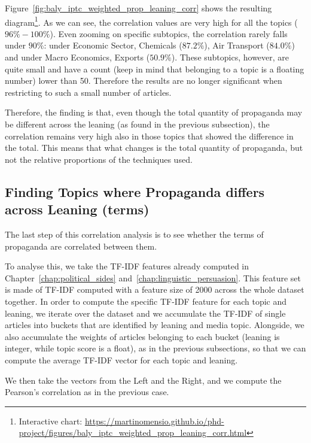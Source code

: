 Figure~\ref{fig:baly_iptc_weighted_prop_leaning_corr} shows the resulting diagram\footnote{Interactive chart: \url{https://martinomensio.github.io/phd-project/figures/baly_iptc_weighted_prop_leaning_corr.html}}. As we can see, the correlation values are very high for all the topics ($96\% - 100\%$). Even zooming on specific subtopics, the correlation rarely falls under $90\%$: under Economic Sector, Chemicals ($87.2\%$), Air Transport ($84.0\%$) and under Macro Economics, Exports ($50.9\%$). 
These subtopics, however, are quite small and have a count (keep in mind that belonging to a topic is a floating number) lower than 50. Therefore the results are no longer significant when restricting to such a small number of articles.

Therefore, the finding is that, even though the total quantity of propaganda may be different across the leaning (as found in the previous subsection), the correlation remains very high also in those topics that showed the difference in the total.
This means that what changes is the total quantity of propaganda, but not the relative proportions of the techniques used.

\subsection{\statusgreen Finding Topics where Propaganda differs across Leaning (terms)}
\label{ssec:topic_propaganda_leaning_terms}

The last step of this correlation analysis is to see whether the terms of propaganda are correlated between them.

To analyse this, we take the TF-IDF features already computed in Chapter~\ref{chap:political_sides} and~\ref{chap:linguistic_persuasion}.
This feature set is made of TF-IDF computed with a feature size of 2000 across the whole dataset together.
In order to compute the specific TF-IDF feature for each topic and leaning, we iterate over the dataset and we accumulate the TF-IDF of single articles into buckets that are identified by leaning and media topic.
Alongside, we also accumulate the weights of articles belonging to each bucket (leaning is integer, while topic score is a float), as in the previous subsections, so that we can compute the average TF-IDF vector for each topic and leaning.

We then take the vectors from the Left and the Right, and we compute the Pearson's correlation as in the previous case.

